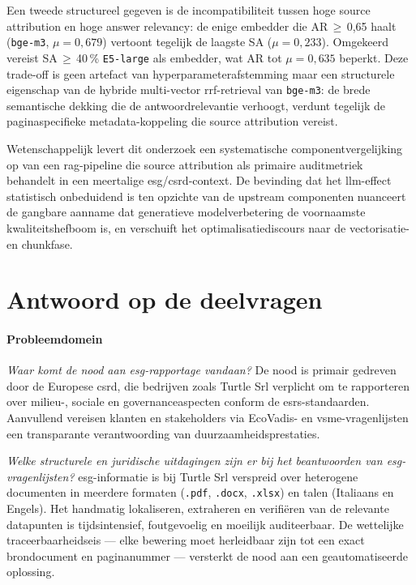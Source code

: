 Een tweede structureel gegeven is de incompatibiliteit tussen hoge source attribution en hoge answer relevancy: de enige embedder die AR\,$\geq$\,0{,}65 haalt (\texttt{bge-m3}, $\mu = 0{,}679$) vertoont tegelijk de laagste SA ($\mu = 0{,}233$). Omgekeerd vereist SA\,$\geq$\,40\,\% \texttt{E5-large} als embedder, wat AR tot $\mu = 0{,}635$ beperkt. Deze trade-off is geen artefact van hyperparameterafstemming maar een structurele eigenschap van de hybride multi-vector \gls{rrf}-retrieval van \texttt{bge-m3}: de brede semantische dekking die de antwoordrelevantie verhoogt, verdunt tegelijk de paginaspecifieke metadata-koppeling die source attribution vereist.

Wetenschappelijk levert dit onderzoek een systematische componentvergelijking op van een \gls{rag}-pipeline die source attribution als primaire auditmetriek behandelt in een meertalige \gls{esg}/\gls{csrd}-context. De bevinding dat het \gls{llm}-effect statistisch onbeduidend is ten opzichte van de upstream componenten nuanceert de gangbare aanname dat generatieve modelverbetering de voornaamste kwaliteitshefboom is, en verschuift het optimalisatiediscours naar de vectorisatie- en chunkfase.

\section{Antwoord op de deelvragen}
\label{sec:antwoord-deelvragen}

\paragraph{Probleemdomein}

\textit{Waar komt de nood aan \gls{esg}-rapportage vandaan?}
De nood is primair gedreven door de Europese \gls{csrd}, die bedrijven zoals Turtle Srl verplicht om te rapporteren over milieu-, sociale en governanceaspecten conform de \gls{esrs}-standaarden. Aanvullend vereisen klanten en stakeholders via EcoVadis- en \gls{vsme}-vragenlijsten een transparante verantwoording van duurzaamheidsprestaties.

\textit{Welke structurele en juridische uitdagingen zijn er bij het beantwoorden van \gls{esg}-vragenlijsten?}
\gls{esg}-informatie is bij Turtle Srl verspreid over heterogene documenten in meerdere formaten (\texttt{.pdf}, \texttt{.docx}, \texttt{.xlsx}) en talen (Italiaans en Engels). Het handmatig lokaliseren, extraheren en verifiëren van de relevante datapunten is tijdsintensief, foutgevoelig en moeilijk auditeerbaar. De wettelijke traceerbaarheidseis — elke bewering moet herleidbaar zijn tot een exact brondocument en paginanummer — versterkt de nood aan een geautomatiseerde oplossing.

